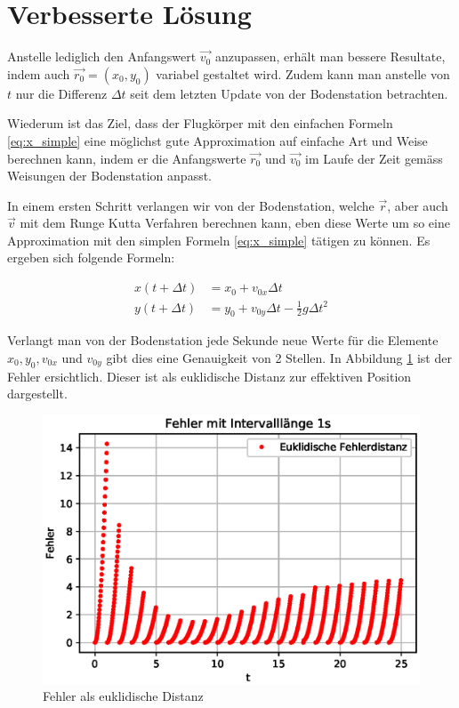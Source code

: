 \section{Verbesserte Lösung
\label{perturbation:section:verbesserte_loesung}}

Anstelle lediglich den Anfangswert $\vec{v_0}$ anzupassen, erhält man bessere Resultate, indem auch $\vec{r_0} = (x_0, y_0)$ variabel gestaltet wird.
Zudem kann man anstelle von $t$ nur die Differenz $\Delta t$ seit dem letzten Update von der Bodenstation betrachten.

Wiederum ist das Ziel, dass der Flugkörper mit den einfachen Formeln \eqref{eq:x_simple} eine möglichst gute Approximation auf einfache Art und Weise berechnen kann,
indem er die Anfangswerte $\vec{r_0}$ und $\vec{v_0}$ im Laufe der Zeit gemäss Weisungen der Bodenstation anpasst.

In einem ersten Schritt verlangen wir von der Bodenstation, welche $\vec{r}$, aber auch $\vec{v}$ mit dem Runge Kutta Verfahren berechnen kann,
eben diese Werte um so eine Approximation mit den simplen Formeln \eqref{eq:x_simple} tätigen zu können.
Es ergeben sich folgende Formeln:

\begin{equation}
\begin{aligned}
x(t + \Delta t) &= x_0 + v_{0x}\Delta t\\
y(t + \Delta t) &= y_0 + v_{0y}\Delta t - \frac{1}{2}g\Delta t^2
\end{aligned}
\end{equation}

Verlangt man von der Bodenstation jede Sekunde neue Werte für die Elemente $x_0, y_0, v_{0x}$ und $v_{0y}$ gibt dies eine Genauigkeit von 2 Stellen.
In Abbildung \ref{error} ist der Fehler ersichtlich.
Dieser ist als euklidische Distanz zur effektiven Position dargestellt.

\begin{figure}
    \centering
    \includegraphics[scale = 0.7]{papers/perturbation/bilder/perturbation_fig3.eps}
    \caption{Fehler als euklidische Distanz}
	\label{error}
\end{figure}